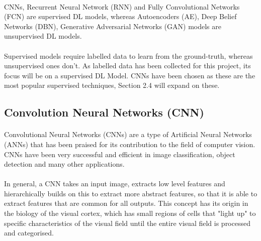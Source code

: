 \documentclass{article}
\begin{document}
\paragraph{}
CNNs, Recurrent Neural Network (RNN) and Fully Convolutional Networks (FCN) are supervised DL models, whereas Autoencoders (AE), Deep Belief Networks (DBN), Generative Adversarial Networks (GAN) models are unsupervised DL models. 
    
\paragraph{}
Supervised models require labelled data to learn from the ground-truth, whereas unsupervised ones don't.  As labelled data has been collected for this project, its focus will be on a supervised DL Model. CNNs have been chosen as these are the most popular supervised techniques, Section 2.4 will expand on these.

\subsection{Convolution Neural Networks (CNN)}
\paragraph{}

Convolutional Neural Networks (CNNs) are a type of Artificial Neural Networks (ANNs) that has been praised for its contribution to the field of computer vision. CNNs have been very successful  and efficient in image classification, object detection and many other applications.
\paragraph{}
In general, a CNN takes an input image, extracts low level features and hierarchically builds on this to extract more abstract features, so that it is able to extract features that are common for all outputs. This concept has its origin in the biology of the visual cortex, which has small regions of cells that "light up" to specific characteristics of the visual field until the entire visual field is processed and categorised.
\end{document}
